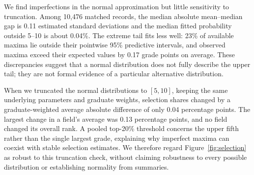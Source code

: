 We find imperfections in the normal approximation but little sensitivity to truncation. Among 10,476 matched records, the median absolute mean--median gap is 0.11 estimated standard deviations and the median fitted probability outside 5--10 is about 0.04\%. The extreme tail fits less well: 23\% of available maxima lie outside their pointwise 95\% predictive intervals, and observed maxima exceed their expected values by 0.17 grade points on average. These discrepancies suggest that a normal distribution does not fully describe the upper tail; they are not formal evidence of a particular alternative distribution.

When we truncated the normal distributions to $[5,10]$, keeping the same underlying parameters and graduate weights, selection shares changed by a graduate-weighted average absolute difference of only 0.04 percentage points. The largest change in a field's average was 0.13 percentage points, and no field changed its overall rank. A pooled top-20\% threshold concerns the upper fifth rather than the single largest grade, explaining why imperfect maxima can coexist with stable selection estimates. We therefore regard Figure~\ref{fig:selection} as robust to this truncation check, without claiming robustness to every possible distribution or establishing normality from summaries.
